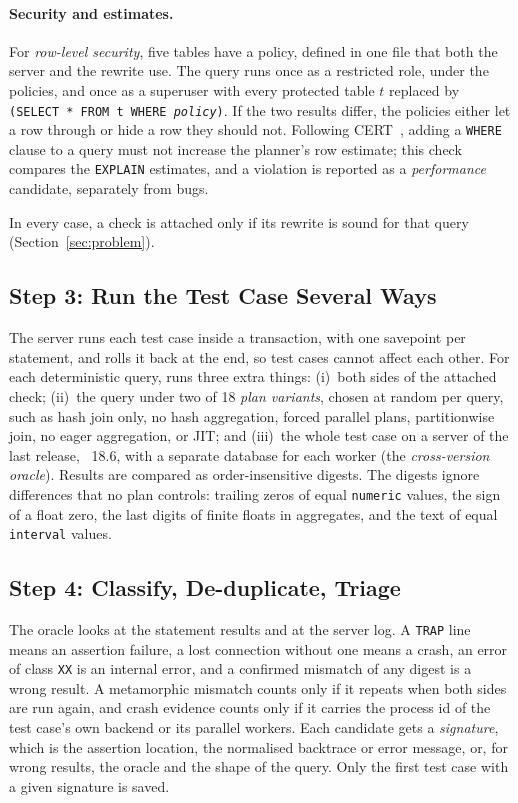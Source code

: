 \paragraph{Security and estimates.} For \emph{row-level security}, five tables
have a policy, defined in one file that both the server and the rewrite use. The
query runs once as a restricted role, under the policies, and once as a
superuser with every protected table $t$ replaced by \texttt{(SELECT * FROM t
WHERE \textit{policy})}. If the two results differ, the policies either let a
row through or hide a row they should not. Following CERT~\cite{ba2024cert},
adding a \texttt{WHERE} clause to a query must not increase the planner's row
estimate; this check compares the \texttt{EXPLAIN} estimates, and a violation is
reported as a \emph{performance} candidate, separately from bugs.

In every case, a check is attached only if its rewrite is sound for that query
(Section~\ref{sec:problem}).

\subsection{Step 3: Run the Test Case Several Ways}
\label{sec:run}

The server runs each test case inside a transaction, with one savepoint per
statement, and rolls it back at the end, so test cases cannot affect each other.
For each deterministic query, \tool runs three extra things: (i)~both sides of
the attached check; (ii)~the query under two of 18 \emph{plan variants}, chosen
at random per query, such as hash join only, no hash aggregation, forced
parallel plans, partitionwise join, no eager aggregation, or JIT; and (iii)~the
whole test case on a server of the last release, \pg~18.6, with a separate
database for each worker (the \emph{cross-version oracle}). Results are compared
as order-insensitive digests. The digests ignore differences that no plan
controls: trailing zeros of equal \texttt{numeric} values, the sign of a float
zero, the last digits of finite floats in aggregates, and the text of equal
\texttt{interval} values.

\subsection{Step 4: Classify, De-duplicate, Triage}
\label{sec:triage}

The oracle looks at the statement results and at the server log. A
\texttt{TRAP} line means an assertion failure, a lost connection without one
means a crash, an error of class \texttt{XX} is an internal error, and a
confirmed mismatch of any digest is a wrong result. A metamorphic mismatch
counts only if it repeats when both sides are run again, and crash evidence
counts only if it carries the process id of the test case's own backend or its
parallel workers. Each candidate gets a \emph{signature}, which is the assertion
location, the normalised backtrace or error message, or, for wrong results, the
oracle and the shape of the query. Only the first test case with a given
signature is saved.

